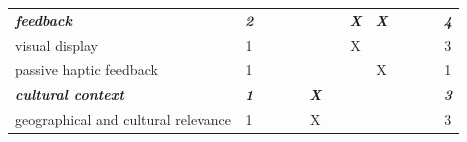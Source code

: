\documentclass[letterpaper, 12pt]{article}
\begin{document}
\begin{spacing}{1.1}
\begin{longtable}{L{5.3cm}cccccccccccc}
        \emph{\textbf{feedback}} & \emph{\textbf{2}} & & & & & & \emph{\textbf{X}} & \emph{\textbf{X}} &   &   &   & \emph{\textbf{4}}  \\
        visual display                   & 1  &   &   &   &   &   & X &   &   &   &   & 3  \\
        passive haptic feedback          & 1  &   &   &   &   &   &   & X &   &   &   & 1  \\
        \hline

        \emph{\textbf{cultural context}} & \emph{\textbf{1}} & & & & \emph{\textbf{X}} & & & & & & & \emph{\textbf{3}} \\
        geographical and cultural relevance  & 1  &   &   &   & X &   &   &   &   &   &   & 3  \\
        \hline
    \end{longtable}
\end{spacing}
\end{document}
